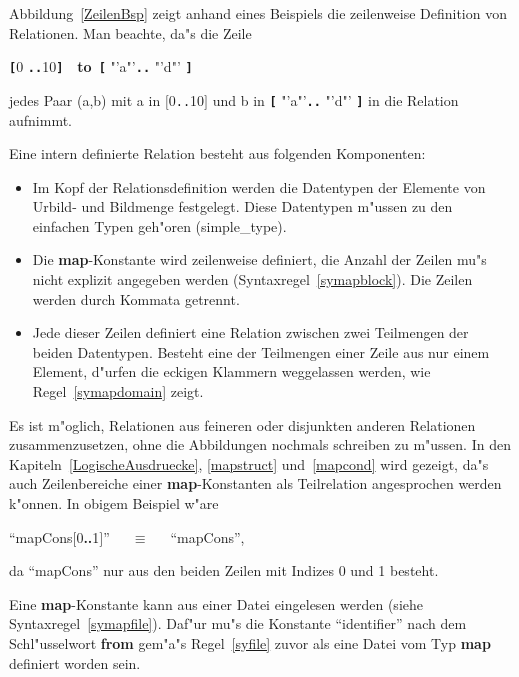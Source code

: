 Abbildung~\ref{ZeilenBsp} zeigt anhand eines Beispiels die zeilenweise
Definition von Relationen. Man
beachte, da"s die Zeile\\ \centerline{{\bf \verb&[&}0{\bf
\verb&..&}10{\bf \verb&]&}~~{\bf to}~{\bf \verb&[&}
"'a"'{\bf \verb&..&} "'d"' {\bf \verb&]&}}
jedes Paar (a,b) mit a in $[$0\verb&..&10$]$ und b in {\bf \verb&[&}
"'a"'{\bf \verb&..&} "'d"' {\bf \verb&]&} in
die Relation aufnimmt.

Eine intern definierte Relation besteht aus folgenden Komponenten:

\begin{itemize}
\item Im Kopf der Relationsdefinition werden die
Datentypen der Elemente von Urbild- und Bildmenge festgelegt. Diese
Datentypen m"ussen zu den einfachen Typen geh"oren (simple\_type).
  
\item Die {\bf map}-Konstante wird zeilenweise definiert, die Anzahl
der Zeilen mu"s nicht explizit angegeben werden
(Syntaxregel~\ref{symapblock}). Die Zeilen werden durch Kommata
getrennt.

\item Jede dieser Zeilen definiert eine Relation zwischen zwei
Teilmengen der beiden Datentypen.  Besteht eine der Teilmengen
einer Zeile aus nur einem Element, d"urfen die eckigen Klammern
weggelassen werden, wie Regel~\ref{symapdomain} zeigt.
\end{itemize}

Es ist m"oglich, Relationen aus feineren oder
disjunkten anderen Relationen
zusammenzusetzen, ohne die Abbildungen nochmals schreiben zu m"ussen.
In den Kapiteln~\ref{LogischeAusdruecke}, \ref{mapstruct}
und~\ref{mapcond} wird gezeigt, da"s auch Zeilenbereiche
 einer {\bf map}-Konstanten
 als Teilrelation
 angesprochen werden k"onnen. In obigem Beispiel
w"are\\

\centerline{``mapCons$[$0{\bf ..}1$]$''~~~$\equiv$~~~``mapCons'',}

da ``mapCons'' nur aus den beiden Zeilen mit Indizes 0 und 1 besteht.

\label{filemap}

Eine {\bf map}-Konstante kann aus einer Datei eingelesen
werden (siehe Syntaxregel~\ref{symapfile}).  Daf"ur mu"s die Konstante
``identifier'' nach dem Schl"usselwort {\bf from} gem"a"s
Regel~\ref{syfile} zuvor als eine Datei vom Typ {\bf map}
definiert worden sein.

